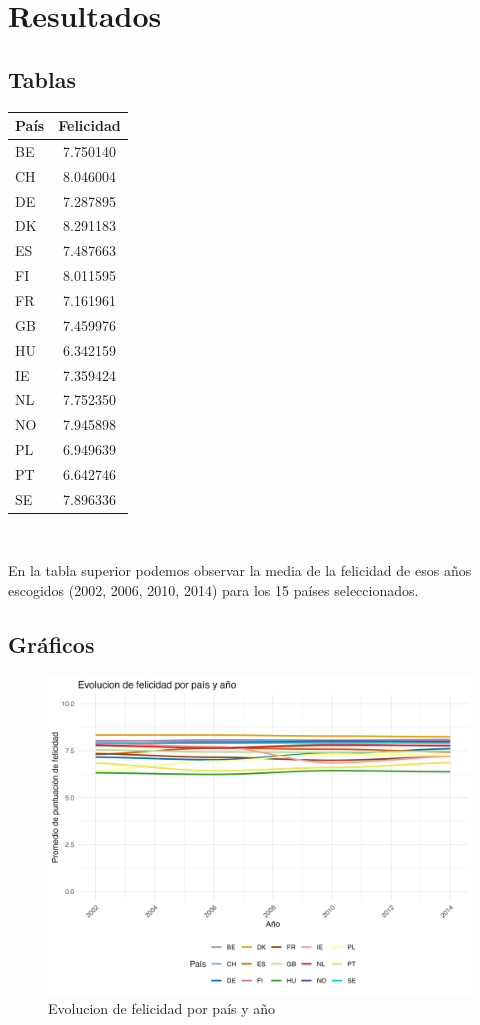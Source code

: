 \documentclass{article}
\begin{document}
\section {Resultados}

\subsection{Tablas}

\begin {tabular}{l | c }
  

\hline
\bf{País} & \bf{Felicidad} \\ 
\hline
BE &	7.750140 \\		
CH &	8.046004 \\		
DE &	7.287895 \\		
DK &	8.291183 \\	
ES &	7.487663 \\	
FI &	8.011595 \\			
FR &	7.161961 \\			
GB &	7.459976 \\			
HU &	6.342159 \\			
IE &	7.359424 \\			
NL &	7.752350 \\			
NO &	7.945898 \\			
PL &	6.949639 \\			
PT &	6.642746 \\			
SE &	7.896336 \\			
\hline
\end{tabular}
\\	
\vspace{0.5cm}
\vspace{0.5cm}

En la tabla superior podemos observar la media de la felicidad de esos años escogidos (2002, 2006, 2010, 2014) para los 15 países seleccionados. 

\subsection {Gráficos}
\begin{figure}[h!]
\centering
\includegraphics[scale=0.8]{grafico1.png}
\caption{Evolucion de felicidad por país y año}
\end{figure}
\end{document}
